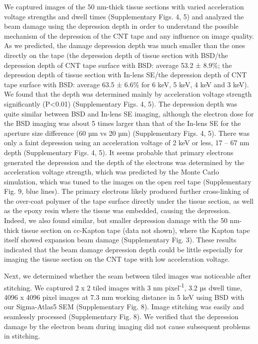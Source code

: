 \documentclass{article}
\begin{document}
We captured images of the 50 nm-thick tissue sections with varied acceleration voltage strengths and dwell times (Supplementary Figs. 4, 5) and analyzed the beam damage using the depression depth in order to understand the possible mechanism of the depression of the CNT tape and any influence on image quality. As we predicted, the 
damage depression depth was much smaller than the ones directly on the tape (the depression depth of tissue section with BSD/the depression depth of CNT tape surface with BSD: average 53.2 ± 8.9\%; the depression depth of tissue section with In-lens SE/the depression depth of CNT tape surface with BSD: average 63.5 ± 6.6\% for 6 keV, 5 keV, 4 keV and 3 keV). We found that the depth was determined mainly by acceleration voltage strength significantly (P<0.01) (Supplementary Figs. 4, 5). The depression depth was quite similar between BSD and In-lens SE imaging, although the electron dose for the BSD imaging was about 5 times larger than that of the In-lens SE for the aperture size difference (60 µm vs 20 µm) (Supplementary Figs. 4, 5). There was only a faint depression using an acceleration voltage of 2 keV or less, 17 – 67 nm depth (Supplementary Figs. 4, 5). It seems probable that primary electrons generated the depression and the depth of the electrons was determined by the acceleration voltage strength, which was predicted by the Monte Carlo simulation, which was tuned to the images on the open reel tape (Supplementary Fig. 9, blue lines). The primary electrons likely produced further cross-linking of the over-coat polymer of the tape surface directly under the tissue section, as well as the epoxy resin where the tissue was embedded, causing the depression. Indeed, we also found similar, but smaller depression damage with the 50 nm-thick tissue section on cc-Kapton tape (data not shown), where the Kapton tape itself showed expansion beam damage (Supplementary Fig. 3). These results indicated that the beam damage depression depth could be little especially for imaging the tissue section on the CNT tape with low acceleration voltage.

Next, we determined whether the seam between tiled images was noticeable after stitching. We captured 2 x 2 tiled images with 3 nm pixel\textsuperscript{-1}, 3.2 µs dwell time, 4096 x 4096 pixel images at 7.3 mm working distance in 5 keV using BSD with our Sigma-Atlas5 SEM (Supplementary Fig. 8). Image stitching was easily and seamlessly processed (Supplementary Fig. 8). We verified that the depression damage by the electron beam during imaging did not cause subsequent problems in stitching.
\end{document}
